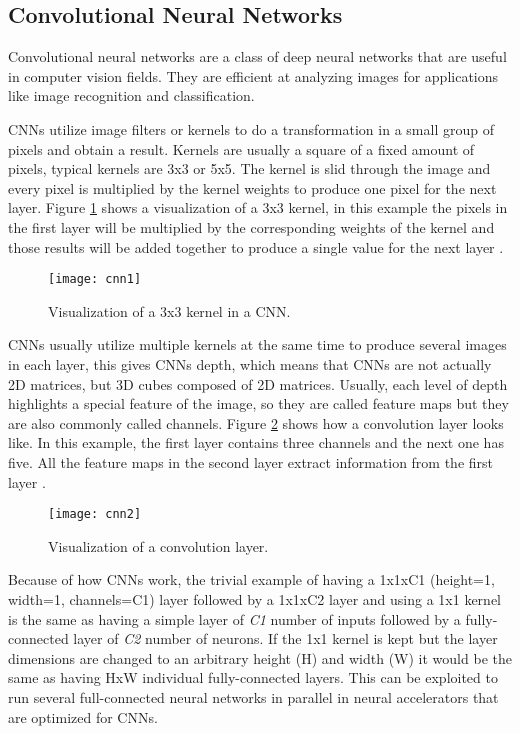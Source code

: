 \subsection{Convolutional Neural Networks}

Convolutional neural networks are a class of deep neural networks that are useful in computer vision fields. They are efficient at analyzing images for applications like image recognition and classification.

CNNs utilize image filters or kernels to do a transformation in a small group of pixels and obtain a result. Kernels are usually a square of a fixed amount of pixels, typical kernels are 3x3 or 5x5. The kernel is slid through the image and every pixel is multiplied by the kernel weights to produce one pixel for the next layer. Figure \ref{fig:cnn1} shows a visualization of a 3x3 kernel, in this example the pixels in the first layer will be multiplied by the corresponding weights of the kernel and those results will be added together to produce a single value for the next layer \cite{guide_cnn}.

\begin{figure}[thbp]
	\centering
	\texttt{[image: cnn1]}
	\caption{Visualization of a 3x3 kernel in a CNN.}
	\label{fig:cnn1}
\end{figure}

CNNs usually utilize multiple kernels at the same time to produce several images in each layer, this gives CNNs depth, which means that CNNs are not actually 2D matrices, but 3D cubes composed of 2D matrices. Usually, each level of depth highlights a special feature of the image, so they are called feature maps but they are also commonly called channels. Figure \ref{fig:cnn2} shows how a convolution layer looks like. In this example, the first layer contains three channels and the next one has five. All the feature maps in the second layer extract information from the first layer \cite{guide_cnn}.

\begin{figure}[thbp]
	\centering
	\texttt{[image: cnn2]}
	\caption{Visualization of a convolution layer.}
	\label{fig:cnn2}
\end{figure}

Because of how CNNs work, the trivial example of having a 1x1xC1 (height=1, width=1, channels=C1) layer followed by a 1x1xC2 layer and using a 1x1 kernel is the same as having a simple layer of \textit{C1} number of inputs followed by a fully-connected layer of \textit{C2} number of neurons. If the 1x1 kernel is kept but the layer dimensions are changed to an arbitrary height (H) and width (W) it would be the same as having HxW individual fully-connected layers. This can be exploited to run several full-connected neural networks in parallel in neural accelerators that are optimized for CNNs.

